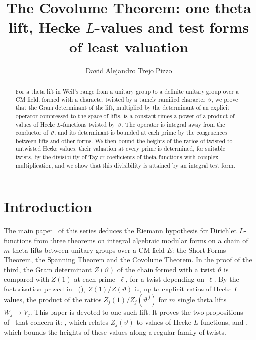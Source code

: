 \documentclass[10pt]{amsart}
\theoremstyle{definition}
\theoremstyle{remark}
\begin{document}
\addtolength{\abovedisplayskip}{-3.4pt}
\addtolength{\belowdisplayskip}{-3.4pt}
\addtolength{\belowdisplayshortskip}{-2pt}
\title[The Covolume Theorem: one theta lift]{The Covolume Theorem: one theta lift, Hecke $L$-values and test forms of least valuation}
\author{David Alejandro Trejo Pizzo}
\date{}
\begin{abstract}
For a theta lift in Weil's range from a unitary group to a definite unitary group over a CM
field, formed with a character twisted by a tamely ramified character~$\vartheta$,
we prove that the Gram determinant of the lift, multiplied by the determinant of an explicit
operator compressed to the space of lifts, is a constant times a power of a product of values of
Hecke $L$-functions twisted by~$\vartheta$. The operator is integral away from the conductor
of~$\vartheta$, and its determinant is bounded at each prime by the congruences between lifts and
other forms. We then bound the heights of the ratios of twisted to untwisted Hecke values: their
valuation at every prime is determined, for suitable twists, by the divisibility of Taylor
coefficients of theta functions with complex multiplication, and we show that this divisibility
is attained by an integral test form.
\end{abstract}
\maketitle
\setcounter{tocdepth}{1}\tableofcontents

\section{Introduction}\label{C2:intro}

The main paper~\cite{P46} of this series deduces the Riemann hypothesis for Dirichlet
$L$-functions from three theorems on integral algebraic modular forms on a chain of $m$ theta
lifts between unitary groups over a CM field $E$: the Short Forms Theorem, the Spanning Theorem
and the Covolume Theorem. In the proof of the third, the Gram determinant $Z(\vartheta)$ of the
chain formed with a twist $\vartheta$ is compared with $Z(1)$ at each prime~$\ell$, for a twist
depending on~$\ell$. By the factorisation proved in~\cite{P53} ({\cite[Proposition~14.37]{P46}}),
$Z(1)/Z(\vartheta)$ is, up to explicit ratios of Hecke $L$-values, the product of the ratios
$Z_j(1)/Z_j(\vartheta^{\,j})$ for $m$ single theta lifts $W_j\to V_j$. This paper is devoted to
one such lift. It proves the two propositions of~\cite{P46} that concern it:
{\cite[Proposition~14.41]{P46}}, which relates $Z_j(\vartheta)$ to values of Hecke $L$-functions,
and {\cite[Proposition~14.42]{P46}}, which bounds the heights of these values along a regular family
of twists.
\end{document}
